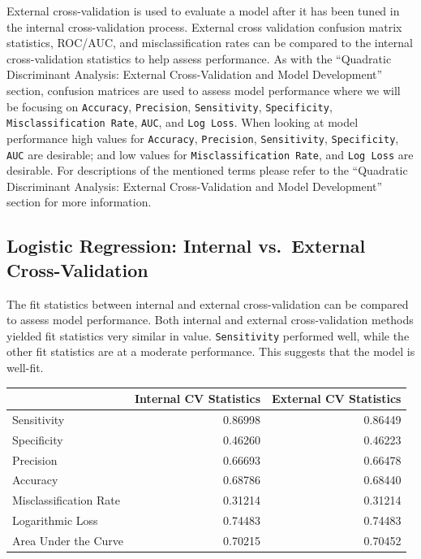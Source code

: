 \documentclass[american,]{article}
\begin{document}
External cross-validation is used to evaluate a model after it has been tuned in the internal cross-validation process. External cross validation confusion matrix statistics, ROC/AUC, and misclassification rates can be compared to the internal cross-validation statistics to help assess performance. As with the ``Quadratic Discriminant Analysis: External Cross-Validation and Model Development'' section, confusion matrices are used to assess model performance where we will be focusing on \texttt{Accuracy}, \texttt{Precision}, \texttt{Sensitivity}, \texttt{Specificity}, \texttt{Misclassification\ Rate}, \texttt{AUC}, and \texttt{Log\ Loss}. When looking at model performance high values for \texttt{Accuracy}, \texttt{Precision}, \texttt{Sensitivity}, \texttt{Specificity}, \texttt{AUC} are desirable; and low values for \texttt{Misclassification\ Rate}, and \texttt{Log\ Loss} are desirable. For descriptions of the mentioned terms please refer to the ``Quadratic Discriminant Analysis: External Cross-Validation and Model Development'' section for more information.

\hypertarget{logistic-regression-internal-vs.external-cross-validation}{%
\subsection{\texorpdfstring{\textbf{Logistic Regression: Internal vs.~External Cross-Validation}}{Logistic Regression: Internal vs.~External Cross-Validation}}\label{logistic-regression-internal-vs.external-cross-validation}}

The fit statistics between internal and external cross-validation can be compared to assess model performance. Both internal and external cross-validation methods yielded fit statistics very similar in value. \texttt{Sensitivity} performed well, while the other fit statistics are at a moderate performance. This suggests that the model is well-fit.

\begin{table}[H]
\centering
\begin{tabular}{lrr}
\toprule
  & Internal CV Statistics & External CV Statistics\\
\midrule
\rowcolor{gray!6}  Sensitivity & 0.86998 & 0.86449\\
Specificity & 0.46260 & 0.46223\\
\rowcolor{gray!6}  Precision & 0.66693 & 0.66478\\
Accuracy & 0.68786 & 0.68440\\
\rowcolor{gray!6}  Misclassification Rate & 0.31214 & 0.31214\\
\addlinespace
Logarithmic Loss & 0.74483 & 0.74483\\
\rowcolor{gray!6}  Area Under the Curve & 0.70215 & 0.70452\\
\bottomrule
\end{tabular}
\end{table}
\end{document}
